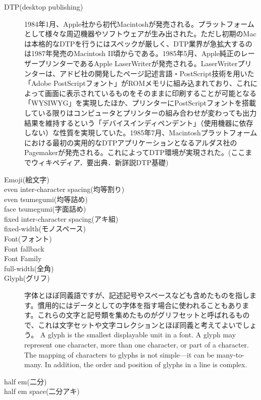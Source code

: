 \begin{description}
    \item[DTP(desktop publishing)]1984年1月、Apple社から初代Macintoshが発売される。プラットフォームとして様々な周辺機器やソフトウェアが生み出された。ただし初期のMacは本格的なDTPを行うにはスペックが厳しく、DTP業界が急拡大するのは1987年発売のMacintosh II頃からである。1985年5月、Apple純正のレーザープリンターであるApple LaserWriterが発売される。LaserWriterプリンターは、アドビ社の開発したページ記述言語・PostScript技術を用いた「Adobe PostScriptフォント」がROMメモリに組み込まれており、これによって画面に表示されているものをそのままに印刷することが可能となる「WYSIWYG」を実現したほか、プリンターにPostScriptフォントを搭載している限りはコンピュータとプリンターの組み合わせが変わっても出力結果を維持するという「デバイスインディペンデント」（使用機器に依存しない）な性質を実現していた。1985年7月、Macintoshプラットフォームにおける最初の実用的なDTPアプリケーションとなるアルダス社のPagemakerが発売される。これによってDTP環境が実現された。(ここまでウィキペディア．要出典．新詳説DTP基礎)
    \item[Emoji(絵文字)]
    \item[even inter-character spacing(均等割り)]
    \item[even tsumegumi(均等詰め)]
    \item[face tsumegumi(字面詰め)]
    \item[fixed inter-character spacing(アキ組)]
    \item[fixed-width(モノスペース)]
    \item[Font(フォント)]
    \item[Font fallback]
    \item[Font Family]
    \item[full-width(全角)]
    \item[Glyph(グリフ)]字体とほぼ同義語ですが、記述記号やスペースなども含めたものを指します。慣用的にはデータとしての字体を指す場合に使われることもあります。これらの文字と記号類を集めたものがグリフセットと呼ばれるもので、これは文字セットや文字コレクションとほぼ同義と考えてよいでしょう。 A glyph is the smallest displayable unit in a font. A glyph may represent one character, more than one character, or part of a character. The mapping of characters to glyphs is not simple—it can be many-to-many. In addition, the order and position of glyphs in a line is complex\cite{developer.apple.com:library/archive/documentation/MacOSX/Conceptual/BPInternational/InternationalizingYourCode/InternationalizingYourCode.html}.
    \item[half em(二分)]
    \item[half em space(二分アキ)]

\end{description}
